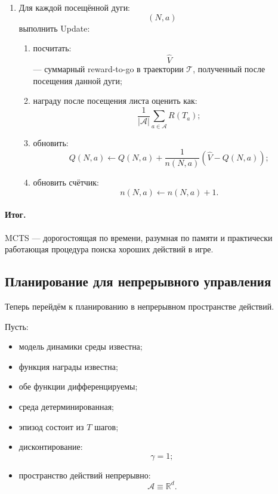 \documentclass[12pt,a4paper]{article}
\begin{document}
\begin{enumerate}
    \item Для каждой посещённой дуги:
    \[
    (N,a)
    \]
    выполнить Update:

    \begin{enumerate}
        \item посчитать:
        \[
        \widehat V
        \]
        --- суммарный reward-to-go в траектории $\mathcal T$, полученный после посещения данной дуги;

        \item награду после посещения листа оценить как:
        \[
        \frac{1}{|\mathcal A|}
        \sum_{a\in\mathcal A}
        R(T_a);
        \]

        \item обновить:
        \[
        Q(N,a)
        \leftarrow
        Q(N,a)
        +
        \frac{1}{n(N,a)}
        \left(
        \widehat V-Q(N,a)
        \right);
        \]

        \item обновить счётчик:
        \[
        n(N,a)
        \leftarrow
        n(N,a)+1.
        \]
    \end{enumerate}
\end{enumerate}

\paragraph{Итог.}

MCTS --- дорогостоящая по времени, разумная по памяти и практически работающая процедура поиска хороших действий в игре.

\subsection{Планирование для непрерывного управления}

Теперь перейдём к планированию в непрерывном пространстве действий.

Пусть:

\begin{itemize}
    \item модель динамики среды известна;
    \item функция награды известна;
    \item обе функции дифференцируемы;
    \item среда детерминированная;
    \item эпизод состоит из $T$ шагов;
    \item дисконтирование:
    \[
    \gamma=1;
    \]
    \item пространство действий непрерывно:
    \[
    \mathcal A\equiv\mathbb R^d.
    \]
\end{itemize}
\end{document}
